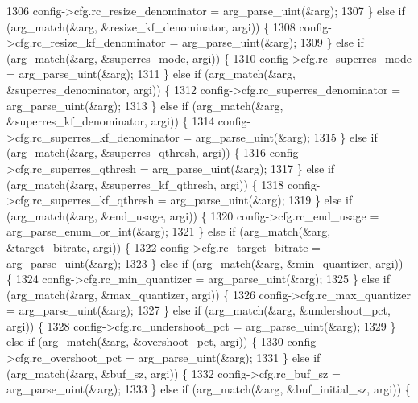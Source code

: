 \begin{DoxyCodeInclude}
{{{{{{{{{{{{{{{{1306       config->cfg.rc\_resize\_denominator = arg\_parse\_uint(&arg);
1307     \} \textcolor{keywordflow}{else} \textcolor{keywordflow}{if} (arg\_match(&arg, &resize\_kf\_denominator, argi)) \{
1308       config->cfg.rc\_resize\_kf\_denominator = arg\_parse\_uint(&arg);
1309     \} \textcolor{keywordflow}{else} \textcolor{keywordflow}{if} (arg\_match(&arg, &superres\_mode, argi)) \{
1310       config->cfg.rc\_superres\_mode = arg\_parse\_uint(&arg);
1311     \} \textcolor{keywordflow}{else} \textcolor{keywordflow}{if} (arg\_match(&arg, &superres\_denominator, argi)) \{
1312       config->cfg.rc\_superres\_denominator = arg\_parse\_uint(&arg);
1313     \} \textcolor{keywordflow}{else} \textcolor{keywordflow}{if} (arg\_match(&arg, &superres\_kf\_denominator, argi)) \{
1314       config->cfg.rc\_superres\_kf\_denominator = arg\_parse\_uint(&arg);
1315     \} \textcolor{keywordflow}{else} \textcolor{keywordflow}{if} (arg\_match(&arg, &superres\_qthresh, argi)) \{
1316       config->cfg.rc\_superres\_qthresh = arg\_parse\_uint(&arg);
1317     \} \textcolor{keywordflow}{else} \textcolor{keywordflow}{if} (arg\_match(&arg, &superres\_kf\_qthresh, argi)) \{
1318       config->cfg.rc\_superres\_kf\_qthresh = arg\_parse\_uint(&arg);
1319     \} \textcolor{keywordflow}{else} \textcolor{keywordflow}{if} (arg\_match(&arg, &end\_usage, argi)) \{
1320       config->cfg.rc\_end\_usage = arg\_parse\_enum\_or\_int(&arg);
1321     \} \textcolor{keywordflow}{else} \textcolor{keywordflow}{if} (arg\_match(&arg, &target\_bitrate, argi)) \{
1322       config->cfg.rc\_target\_bitrate = arg\_parse\_uint(&arg);
1323     \} \textcolor{keywordflow}{else} \textcolor{keywordflow}{if} (arg\_match(&arg, &min\_quantizer, argi)) \{
1324       config->cfg.rc\_min\_quantizer = arg\_parse\_uint(&arg);
1325     \} \textcolor{keywordflow}{else} \textcolor{keywordflow}{if} (arg\_match(&arg, &max\_quantizer, argi)) \{
1326       config->cfg.rc\_max\_quantizer = arg\_parse\_uint(&arg);
1327     \} \textcolor{keywordflow}{else} \textcolor{keywordflow}{if} (arg\_match(&arg, &undershoot\_pct, argi)) \{
1328       config->cfg.rc\_undershoot\_pct = arg\_parse\_uint(&arg);
1329     \} \textcolor{keywordflow}{else} \textcolor{keywordflow}{if} (arg\_match(&arg, &overshoot\_pct, argi)) \{
1330       config->cfg.rc\_overshoot\_pct = arg\_parse\_uint(&arg);
1331     \} \textcolor{keywordflow}{else} \textcolor{keywordflow}{if} (arg\_match(&arg, &buf\_sz, argi)) \{
1332       config->cfg.rc\_buf\_sz = arg\_parse\_uint(&arg);
1333     \} \textcolor{keywordflow}{else} \textcolor{keywordflow}{if} (arg\_match(&arg, &buf\_initial\_sz, argi)) \{
}}}}}}}}}}}}}}}}
\end{DoxyCodeInclude}
